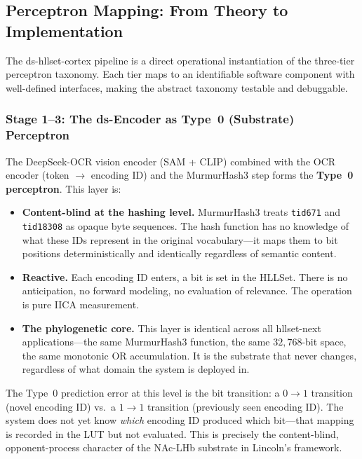 \documentclass[11pt,a4paper]{article}
\theoremstyle{remark}
\begin{document}
\subsection{Perceptron Mapping: From Theory to Implementation}
\label{sec:cortex-mapping}

The ds-hllset-cortex pipeline is a direct operational instantiation of the
three-tier perceptron taxonomy. Each tier maps to an identifiable software
component with well-defined interfaces, making the abstract taxonomy testable
and debuggable.

\subsubsection{Stage 1--3: The ds-Encoder as Type~0 (Substrate) Perceptron}

The DeepSeek-OCR vision encoder (SAM + CLIP) combined with the OCR encoder
(token $\to$ encoding ID) and the MurmurHash3 step forms the \textbf{Type~0
perceptron}. This layer is:

\begin{itemize}[leftmargin=*,nosep]
  \item \textbf{Content-blind at the hashing level.} MurmurHash3 treats
    \texttt{tid671} and \texttt{tid18308} as opaque byte sequences. The hash
    function has no knowledge of what these IDs represent in the original
    vocabulary---it maps them to bit positions deterministically and
    identically regardless of semantic content.
  \item \textbf{Reactive.} Each encoding ID enters, a bit is set in the
    HLLSet. There is no anticipation, no forward modeling, no evaluation of
    relevance. The operation is pure IICA measurement.
  \item \textbf{The phylogenetic core.} This layer is identical across all
    hllset-next applications---the same MurmurHash3 function, the same
    $32{,}768$-bit space, the same monotonic OR accumulation. It is the
    substrate that never changes, regardless of what domain the system is
    deployed in.
\end{itemize}

The Type~0 prediction error at this level is the bit transition: a $0 \to 1$
transition (novel encoding ID) vs.\ a $1 \to 1$ transition (previously seen
encoding ID). The system does not yet know \textit{which} encoding ID produced
which bit---that mapping is recorded in the LUT but not evaluated. This is
precisely the content-blind, opponent-process character of the NAc-LHb substrate
in Lincoln's framework.
\end{document}
